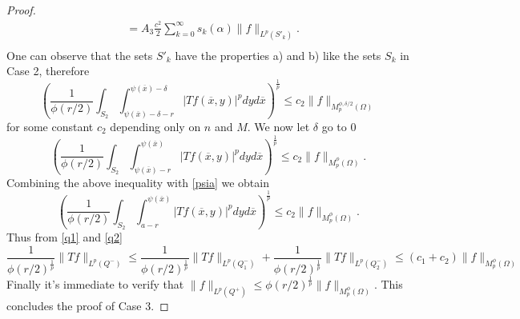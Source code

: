 \documentclass[12pt]{article}
\theoremstyle{definition}
\begin{document}
\begin{proof}
\begin{align*}
&=A_3 \frac{c^2}{2} \sum_{k=0}^\infty s_k(\alpha) \|f\|_{L^p(S'_k)}. \\
\end{align*}
One can observe that the sets $S'_k$ have the properties a) and b) like the sets $S_k$ in Case 2, therefore
\[  \left(\frac{1}{\phi(r/2)}\int_{S_2} \int_{\psi(\overline x)-\delta-r}^{\psi(\overline x)-\delta}|Tf(\overline x,y)|^p dy d\overline x\right)^{\frac{1}{p}}\le c_2 \| f\|_{M_p^{\phi,\delta/2}(\Omega)} \]
for some constant $c_2$ depending only on $n$ and $M$. We now let $\delta$ go to 0 
\begin{equation}
  \left(\frac{1}{\phi(r/2)}\int_{S_2} \int_{\psi(\overline x)-r}^{\psi(\overline x)}|Tf(\overline x,y)|^p dy d\overline x\right)^{\frac{1}{p}}\le c_2 \| f\|_{M_p^\phi(\Omega)} . \label{q2}
 \end{equation}
Combining the above inequality with \eqref{psia} we obtain
\[  \left(\frac{1}{\phi(r/2)}\int_{S_2} \int_{a-r}^{\psi(\overline x)}|Tf(\overline x,y)|^p dy d\overline x\right)^{\frac{1}{p}}\le c_2 \| f\|_{M_p^\phi(\Omega)} .\]
Thus from \eqref{q1} and \eqref{q2}
\[ \frac{1}{\phi(r/2)^{\frac{1}{p}}} \| Tf\|_{L^p(Q^-)} \le \frac{1}{\phi(r/2)^{\frac{1}{p}}} \| Tf\|_{L^p(Q^-_1)} +\frac{1}{\phi(r/2)^{\frac{1}{p}}} \| Tf\|_{L^p(Q^-_2)} \le (c_1 +c_2)\| f\|_{M_p^\phi(\Omega)} \]
 Finally it's immediate to verify that $\| f\|_{L^p(Q^+)} \le \phi(r/2)^{\frac{1}{p}} \| f\|_{M_p^\phi(\Omega)}.$ This concludes the proof of Case 3.


\end{proof}
\end{document}
